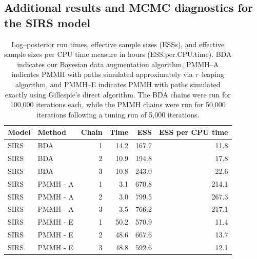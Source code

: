 \subsection{Additional results and MCMC diagnostics for the SIRS model}

\begin{table}[htbp]
	\centering
	\begin{tabular}{llrrrr}
		\hline
		Model & Method & Chain & Time & ESS & ESS per CPU time \\ 
		\hline
		SIRS & BDA &  1 & 14.2 & 167.7 & 11.8 \\ 
		SIRS & BDA &  2 & 10.9 & 194.8 & 17.8 \\ 
		SIRS & BDA &  3 & 10.8 & 243.0 & 22.6 \\ 
		SIRS & PMMH - A &  1 & 3.1 & 670.8 & 214.1 \\ 
		SIRS & PMMH - A &  2 & 3.0 & 799.5 & 267.3 \\ 
		SIRS & PMMH - A &  3 & 3.5 & 766.2 & 217.1 \\ 
		SIRS & PMMH - E &  1 & 50.2 & 570.9 & 11.4 \\ 
		SIRS & PMMH - E &  2 & 48.6 & 667.6 & 13.7 \\ 
		SIRS & PMMH - E &  3 & 48.8 & 592.6 & 12.1 \\ 
		\hline
	\end{tabular}
	\caption{Log--posterior run times, effective sample sizes (ESSs), and effective sample sizes per CPU time measure in hours (ESS.per.CPU.time). BDA indicates our Bayesian data augmentation algorithm, PMMH--A indicates PMMH with paths simulated approximately via $ \tau $--leaping algorithm, and PMMH--E indicates PMMH with paths simulated exactly using Gillespie's direct algorithm. The BDA chains were run for 100,000 iterations each, while the PMMH chains were run for 50,000 iterations following a tuning run of 5,000 iterations.}
	\label{tab:sim1_sirs_ess}
\end{table}

